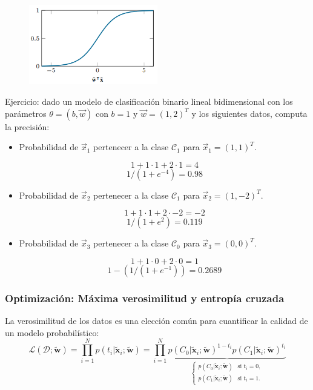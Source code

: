 \begin{figure}[h]
\centering
\includegraphics[width = 0.5\textwidth]{figs/sigmoidal.png}
\end{figure}  

Ejercicio: dado un modelo de clasificación binario lineal bidimensional con los parámetros $\theta = (b, \vec{w})$ con $b=1$ y $\vec{w} = (1,2)^T$ y los siguientes datos, computa la precisión:
\begin{itemize}
\item Probabilidad de $\vec{x}_1$ pertenecer a la clase $\mathcal{C}_1$ para $\vec{x}_1 = (1,1)^T$.

$$1 + 1 \cdot 1 + 2 \cdot 1 = 4$$
$$1 / (1 + e^{-4}) = 0.98$$

\item Probabilidad de $\vec{x}_2$ pertenecer a la clase $\mathcal{C}_1$ para $\vec{x}_2 = (1,-2)^T$.

$$1 + 1 \cdot 1 + 2 \cdot -2 = -2$$
$$1 / (1 + e^{2}) = 0.119$$

\item Probabilidad de $\vec{x}_3$ pertenecer a la clase $\mathcal{C}_0$ para $\vec{x}_3 = (0,0)^T$.

$$1 + 1 \cdot 0 + 2 \cdot 0 = 1$$
$$1 - (1 / (1 + e^{-1}) )= 0.2689$$
\end{itemize}

\subsubsection{Optimización: Máxima verosimilitud y entropía cruzada}

La verosimilitud de los datos es una elección común para cuantificar la calidad de un modelo probabilístico:
$$
\mathcal{L}(\mathcal{D};\tilde{\mathbf{w}}) = \prod_{i=1}^{N} p(t_i|\tilde{\mathbf{x}}_i; \tilde{\mathbf{w}}) = \prod_{i=1}^{N} \underbrace{p(C_0|\tilde{\mathbf{x}}_i; \tilde{\mathbf{w}})^{1-t_i} p(C_1|\tilde{\mathbf{x}}_i; \tilde{\mathbf{w}})^{t_i}}_{\begin{cases} 
    p(C_0|\tilde{\mathbf{x}}_i; \tilde{\mathbf{w}}) & \text{si } t_i = 0, \\ 
    p(C_1|\tilde{\mathbf{x}}_i; \tilde{\mathbf{w}}) & \text{si } t_i = 1. 
\end{cases}}
$$

